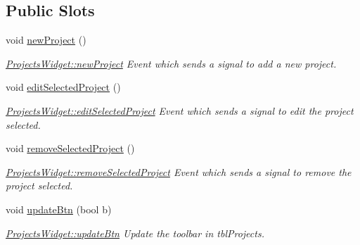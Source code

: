 \subsection*{Public Slots}
\begin{DoxyCompactItemize}
\item 
\hypertarget{classGui_1_1Widgets_1_1ProjectsWidget_acd6cd65ef7bf569ce4e44436d2f8b4f4}{void \hyperlink{classGui_1_1Widgets_1_1ProjectsWidget_acd6cd65ef7bf569ce4e44436d2f8b4f4}{new\-Project} ()}\label{classGui_1_1Widgets_1_1ProjectsWidget_acd6cd65ef7bf569ce4e44436d2f8b4f4}

\begin{DoxyCompactList}\small\item\em \hyperlink{classGui_1_1Widgets_1_1ProjectsWidget_acd6cd65ef7bf569ce4e44436d2f8b4f4}{Projects\-Widget\-::new\-Project} Event which sends a signal to add a new project. \end{DoxyCompactList}\item 
\hypertarget{classGui_1_1Widgets_1_1ProjectsWidget_a33284320194d2c20ac6a47ebaaa57ad4}{void \hyperlink{classGui_1_1Widgets_1_1ProjectsWidget_a33284320194d2c20ac6a47ebaaa57ad4}{edit\-Selected\-Project} ()}\label{classGui_1_1Widgets_1_1ProjectsWidget_a33284320194d2c20ac6a47ebaaa57ad4}

\begin{DoxyCompactList}\small\item\em \hyperlink{classGui_1_1Widgets_1_1ProjectsWidget_a33284320194d2c20ac6a47ebaaa57ad4}{Projects\-Widget\-::edit\-Selected\-Project} Event which sends a signal to edit the project selected. \end{DoxyCompactList}\item 
\hypertarget{classGui_1_1Widgets_1_1ProjectsWidget_a02d9111ae56ff401bc512fa218161d94}{void \hyperlink{classGui_1_1Widgets_1_1ProjectsWidget_a02d9111ae56ff401bc512fa218161d94}{remove\-Selected\-Project} ()}\label{classGui_1_1Widgets_1_1ProjectsWidget_a02d9111ae56ff401bc512fa218161d94}

\begin{DoxyCompactList}\small\item\em \hyperlink{classGui_1_1Widgets_1_1ProjectsWidget_a02d9111ae56ff401bc512fa218161d94}{Projects\-Widget\-::remove\-Selected\-Project} Event which sends a signal to remove the project selected. \end{DoxyCompactList}\item 
void \hyperlink{classGui_1_1Widgets_1_1ProjectsWidget_a3051880516e89826876afdf01fa6637a}{update\-Btn} (bool b)
\begin{DoxyCompactList}\small\item\em \hyperlink{classGui_1_1Widgets_1_1ProjectsWidget_a3051880516e89826876afdf01fa6637a}{Projects\-Widget\-::update\-Btn} Update the toolbar in tbl\-Projects. \end{DoxyCompactList}\end{DoxyCompactItemize}
